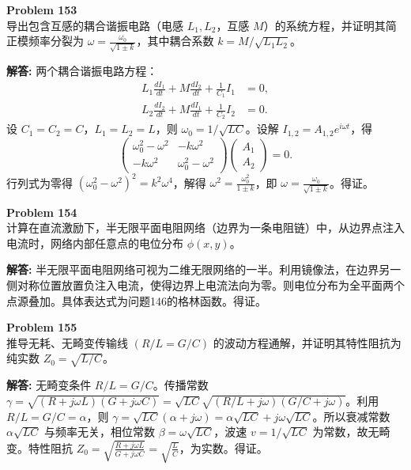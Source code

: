 \documentclass[12pt, a4paper, oneside]{ctexart}
\newenvironment{solution}{\par\noindent\textbf{解答:}\quad}{\par}
\begin{document}
\begin{mdframed}[backgroundcolor=gray!10, linewidth=0pt]
    \textbf{Problem 153} \\
    导出包含互感的耦合谐振电路（电感 $L_1, L_2$，互感 $M$）的系统方程，并证明其简正模频率分裂为 $\omega = \frac{\omega_0}{\sqrt{1 \pm k}}$，其中耦合系数 $k = M/\sqrt{L_1 L_2}$。
\end{mdframed}
\begin{solution}
    两个耦合谐振电路方程：
    \[
    \begin{aligned}
        L_1 \frac{dI_1}{dt} + M \frac{dI_2}{dt} + \frac{1}{C_1} I_1 &= 0, \\
        L_2 \frac{dI_2}{dt} + M \frac{dI_1}{dt} + \frac{1}{C_2} I_2 &= 0.
    \end{aligned}
    \]
    设 $C_1 = C_2 = C$，$L_1 = L_2 = L$，则 $\omega_0 = 1/\sqrt{LC}$。设解 $I_{1,2} = A_{1,2} e^{i\omega t}$，得
    \[
    \begin{pmatrix}
        \omega_0^2 - \omega^2 & -k \omega^2 \\
        -k \omega^2 & \omega_0^2 - \omega^2
    \end{pmatrix} \begin{pmatrix} A_1 \\ A_2 \end{pmatrix} = 0.
    \]
    行列式为零得 $(\omega_0^2 - \omega^2)^2 = k^2 \omega^4$，解得 $\omega^2 = \frac{\omega_0^2}{1 \pm k}$，即 $\omega = \frac{\omega_0}{\sqrt{1 \pm k}}$。得证。
\end{solution}

\begin{mdframed}[backgroundcolor=gray!10, linewidth=0pt]
    \textbf{Problem 154} \\
    计算在直流激励下，半无限平面电阻网络（边界为一条电阻链）中，从边界点注入电流时，网络内部任意点的电位分布 $\phi(x,y)$。
\end{mdframed}
\begin{solution}
    半无限平面电阻网络可视为二维无限网络的一半。利用镜像法，在边界另一侧对称位置放置负注入电流，使得边界上电流法向为零。则电位分布为全平面两个点源叠加。具体表达式为问题146的格林函数。得证。
\end{solution}

\begin{mdframed}[backgroundcolor=gray!10, linewidth=0pt]
    \textbf{Problem 155} \\
    推导无耗、无畸变传输线 $(R/L = G/C)$ 的波动方程通解，并证明其特性阻抗为纯实数 $Z_0 = \sqrt{L/C}$。
\end{mdframed}
\begin{solution}
    无畸变条件 $R/L = G/C$。传播常数 $\gamma = \sqrt{(R+j\omega L)(G+j\omega C)} = \sqrt{LC} \sqrt{(R/L + j\omega)(G/C + j\omega)}$。利用 $R/L = G/C = \alpha$，则 $\gamma = \sqrt{LC} (\alpha + j\omega) = \alpha \sqrt{LC} + j\omega \sqrt{LC}$。所以衰减常数 $\alpha \sqrt{LC}$ 与频率无关，相位常数 $\beta = \omega \sqrt{LC}$，波速 $v = 1/\sqrt{LC}$ 为常数，故无畸变。特性阻抗 $Z_0 = \sqrt{\frac{R+j\omega L}{G+j\omega C}} = \sqrt{\frac{L}{C}}$，为实数。得证。
\end{solution}
\end{document}

